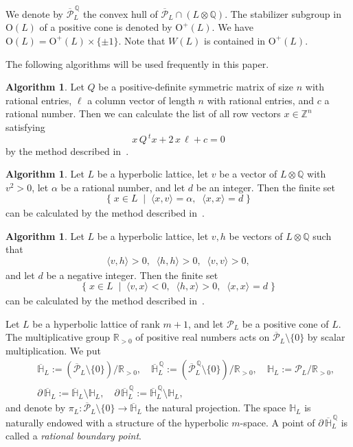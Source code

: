 \documentclass{amsart}
\theoremstyle{plain}
\theoremstyle{definition}
\newtheorem{algorithm}[theorem]{Algorithm}
\theoremstyle{remark}
\numberwithin{equation}{section}
\numberwithin{table}{section}
\numberwithin{figure}{section}
\renewcommand{\H}{\mathord{\mathbb H}}
\newcommand{\Q}{\mathord{\mathbb  Q}}
\newcommand{\R}{\mathord{\mathbb R}}
\newcommand{\Z}{\mathord{\mathbb Z}}
\newcommand{\PPP}{\mathord{\mathcal P}}
\newcommand{\set}[2]{\{\; {#1} \; \mid \; {#2} \;  \}}
\newcommand{\tensor}{\otimes}
\newcommand{\bdr}{\partial\,}
\newcommand{\OG}{\mathord{\mathrm {O}}}
\newcommand{\intM}[2]{\langle{#1}\rangle_{#2}}
\newcommand{\clPPP}{\overline{\PPP}}
\newcommand{\clPPPQ}{\overline{\PPP}^{\,\Q}}
\newcommand{\clH}{\overline{\H}}
\newcommand{\clHQ}{\overline{\H}^{\,\Q}}
\newcommand{\bdrclH}{\bdr\clH}
\newcommand{\bdrclHQ}{\bdr\clH^{\,\Q}}
\begin{document}
We denote by 
$\clPPPQ_L$
the convex hull of $\clPPP_L\cap(L\tensor\Q)$.
The stabilizer subgroup in $\OG(L)$ of a positive cone is denoted by $\OG^+(L)$.
We have $\OG(L)=\OG^+(L)\times\{\pm 1\}$.
Note that $W(L)$ is contained in $\OG^+(L)$.
%
\par
The following 
 algorithms  will be used frequently in this paper.
%
\begin{algorithm}\label{algo:QLc}
Let $Q$ be a positive-definite symmetric matrix of size $n$
with rational entries,
$\ell$ a column vector of length $n$ with rational entries,
and $c$ a rational number.
Then we can calculate the list of all row vectors $x\in \Z^n$
satisfying 
$$
x\,Q\,{}^t x + 2\,  x\, \ell  +c=0
$$
by the method described in~\cite[Section 3.1]{MR3166075}. 
\end{algorithm}
%
\begin{algorithm}\label{algo:QLcab}
Let $L$ be a hyperbolic lattice,
let $v$ be a vector of $L\tensor \Q$ with $v^2>0$,
let $\alpha$ be a rational number,  and let $d$ be an integer.
Then the finite set
$$
\set{x\in L}{\intM{x, v}{}=\alpha, \;\; \intM{x,x}{}=d}
$$
can be calculated by the method 
described in~\cite[Sections 3.2]{MR3166075}.
\end{algorithm}
%
\begin{algorithm}\label{algo:isnef}
Let $L$ be a hyperbolic lattice,
let $v, h$ be  vectors of $L\tensor \Q$ such that
$$
\intM{v, h}{}>0, \;\; \intM{h, h}{}>0,  \;\; \intM{v, v}{}>0,
$$
and
let $d$ be a negative integer.
Then the finite set
$$
\set{x\in L}{\intM{v, x}{}<0, \;\; \intM{h, x}{}>0, \;\; \intM{x, x}{}=d}
$$
can be calculated
by the method 
described in~\cite[Sections 3.3]{MR3166075}.
\end{algorithm}
%
%
Let $L$ be a hyperbolic lattice of rank $m+1$,
and let $\PPP_L$ be a positive cone of $L$.
The multiplicative group $\R_{>0}$ of positive real numbers
acts on $\clPPP_L\setminus\{0\}$ by scalar multiplication.
We put 
%
%
\begin{eqnarray*}
&&\clH_L:=(\clPPP_L\setminus\{0\})/\R_{>0}, \quad \clHQ_L:=(\clPPPQ_L\setminus\{0\})/\R_{>0}, \quad
\H_L:=\PPP_L/\R_{>0},
\\ 
&&\bdrclH_L:=\clH_L\setminus \H_L, \quad \bdrclHQ_L:=\clHQ_L\setminus \H_L,  
\end{eqnarray*}
%
%
and denote by $\pi_L \colon \clPPP_L\setminus\{0\}\to \clH_L$ the natural projection.
The space $\H_L$ is naturally endowed with a structure of the hyperbolic $m$-space.
A point of $\bdrclHQ_L$ is called a \emph{rational boundary point}.
\end{document}
